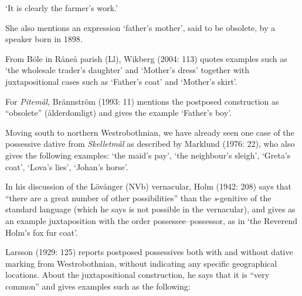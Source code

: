 ‘It is clearly the farmer’s work.’
\z


She also mentions an expression  ‘father’s mother’, said to be obsolete, by a speaker born in 1898.

From Böle in Råneå parish (Ll), Wikberg (2004: 113) quotes examples such as  ‘the wholesale trader’s daughter’ and  ‘Mother’s dress’ together with juxtapositional cases such as  ‘Father’s coat’ and  ‘Mother’s skirt’.

For \textit{Pitemål}, Brännström (1993: 11) mentions the postposed construction as “obsolete” (ålderdomligt) and gives the example  ‘Father’s boy’. 

Moving south to northern Westrobothnian, we have already seen one case of the possessive dative from \textit{Skelletmål} as described by Marklund (1976: 22), who also gives the following examples:  ‘the maid’s pay’,  ‘the neighbour’s sleigh’,  ‘Greta’s coat’,  ‘Lova’s lies’, ‘Johan’s horse’. 

In his discussion of the Lövånger (NVb) vernacular, Holm (1942: 208) says that “there are a great number of other possibilities” than the \textit{s}{}-genitive of the standard language (which he says is not possible in the vernacular), and gives as an example juxtaposition with the order possessee–possessor, as in  ‘the Reverend Holm’s fox fur coat’. 

Larsson (1929: 125) reports postposed possessives both with and without dative marking from Westrobothnian, without indicating any specific geographical locations. About the juxtapositional construction, he says that it is “very common” and gives examples such as the following:

